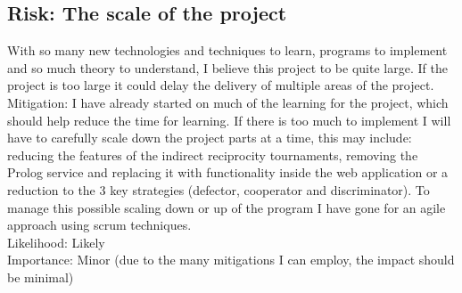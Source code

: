 \documentclass{article}
\begin{document}
\subsection*{Risk: The scale of the project}
With so many new technologies and techniques to learn, programs to implement and so much theory to understand, I believe this project to be quite large. If the project is too large it could delay the delivery of multiple areas of the project.\\
Mitigation: I have already started on much of the learning for the project, which should help reduce the time for learning. If there is too much to implement I will have to carefully scale down the project parts at a time, this may include: reducing the features of the indirect reciprocity tournaments, removing the Prolog service and replacing it with functionality inside the web application or a reduction to the 3 key strategies (defector, cooperator and discriminator). To manage this possible scaling down or up of the program I have gone for an agile approach using scrum techniques.\\
Likelihood: Likely\\
Importance: Minor (due to the many mitigations I can employ, the impact should be minimal)

{}

\end{document}
